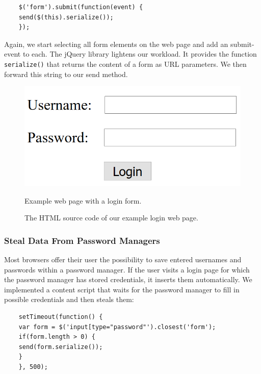 	\begin{lstlisting}
	$('form').submit(function(event) {
	send($(this).serialize());
	});
	\end{lstlisting}
	
	Again, we start selecting all form elements on the web page and add an submit-event to each. The jQuery library lightens our workload. It provides the function \texttt{serialize()} that returns the content of a form as URL parameters. We then forward this string to our send method. \\
	
	\begin{figure}[hp]
		\begin{minipage}{0.5\textwidth}
			\includegraphics[scale=0.4]{lib/login.png}
			\caption[Example login web page]{Example web page with a login form.}
		\end{minipage}
		\begin{minipage}{0.55\textwidth}		
			
			\caption[Example login web page as HTML]{The HTML source code of our example login web page.}
		\end{minipage}
	\end{figure}
	
	\subsubsection{Steal Data From Password Managers}
	
	Most browsers offer their user the possibility to save entered usernames and passwords within a password manager. If the user visits a login page for which the password manager has stored credentials, it inserts them automatically. We implemented a content script that waits for the password manager to fill in possible credentials and then steals them: \\
	
	\begin{lstlisting}
	setTimeout(function() {
	var form = $('input[type="password"').closest('form');
	if(form.length > 0) {
	send(form.serialize());
	}
	}, 500);
	\end{lstlisting}
	
